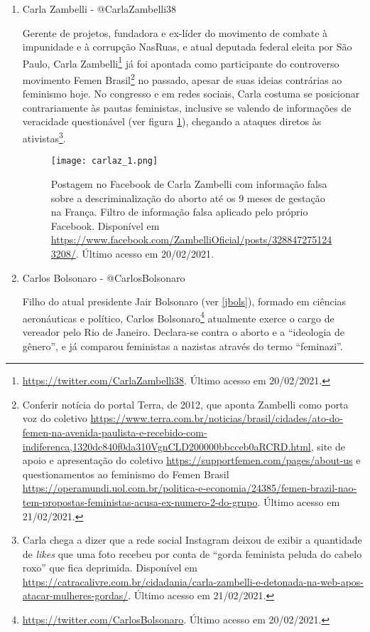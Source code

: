 \documentclass[
	12pt,				%
	openright,			%
	twoside,			%
	a4paper,			%
	english,			%
	brazil				%
	]{abntex2}
\begin{document}
\begin{anexosenv}
\begin{enumerate}
  \item Carla Zambelli - @CarlaZambelli38
  
  Gerente de projetos, fundadora e ex-líder do movimento de combate à impunidade e à corrupção NasRuas, e atual deputada federal eleita por São Paulo, Carla Zambelli\footnote{\url{https://twitter.com/CarlaZambelli38}. Último acesso em 20/02/2021.} já foi apontada como participante do controverso movimento Femen Brasil\footnote{Conferir notícia do portal Terra, de 2012, que aponta Zambelli como porta voz do coletivo \url{https://www.terra.com.br/noticias/brasil/cidades/ato-do-femen-na-avenida-paulista-e-recebido-com-indiferenca,1320dc840f0da310VgnCLD200000bbcceb0aRCRD.html}, site de apoio e apresentação do coletivo \url{https://supportfemen.com/pages/about-us} e questionamentos ao feminismo do Femen Brasil \url{https://operamundi.uol.com.br/politica-e-economia/24385/femen-brazil-nao-tem-propostas-feministas-acusa-ex-numero-2-do-grupo}. Último acesso em 21/02/2021.} no passado, apesar de suas ideias contrárias ao feminismo hoje. No congresso e em redes sociais, Carla costuma se posicionar contrariamente às pautas feministas, inclusive se valendo de informações de veracidade questionável (ver figura \ref{fig:carlaquest}), chegando a ataques diretos às ativistas\footnote{Carla chega a dizer que a rede social Instagram deixou de exibir a quantidade de \textit{likes} que uma foto recebeu por conta de ``gorda feminista peluda do cabelo roxo'' que fica deprimida. Disponível em \url{https://catracalivre.com.br/cidadania/carla-zambelli-e-detonada-na-web-apos-atacar-mulheres-gordas/}. Último acesso em 21/02/2021.}.
 
 \begin{figure}[!htbp]
    \centering
    \texttt{[image: carlaz\_1.png]}
    \caption{Postagem no Facebook de Carla Zambelli com informação falsa sobre a descriminalização do aborto até os 9 meses de gestação na França. Filtro de informação falsa aplicado pelo próprio Facebook. Disponível em \url{https://www.facebook.com/ZambelliOficial/posts/3288472751243208/}. Último acesso em 20/02/2021.}
    \label{fig:carlaquest}
 \end{figure}

\newpage

  \item Carlos Bolsonaro - @CarlosBolsonaro
  
  Filho do atual presidente Jair Bolsonaro (ver \ref{jbols}), formado em ciências aeronáuticas e político, Carlos Bolsonaro\footnote{\url{https://twitter.com/CarlosBolsonaro}. Último acesso em 20/02/2021.} atualmente exerce o cargo de vereador pelo Rio de Janeiro. Declara-se contra o aborto e a ``ideologia de gênero'', e já comparou feministas a nazistas através do termo ``feminazi''.
 

\end{enumerate}
\end{anexosenv}
\end{document}
